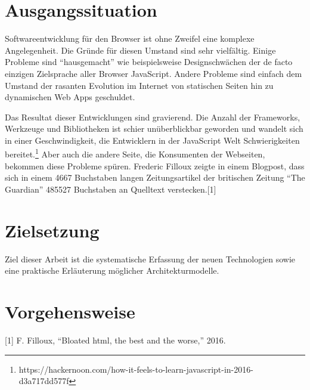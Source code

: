 \section{Ausgangssituation}\label{ausgangssituation}

Softwareentwicklung für den Browser ist ohne Zweifel eine komplexe
Angelegenheit. Die Gründe für diesen Umstand sind sehr vielfältig.
Einige Probleme sind ``hausgemacht'' wie beispielsweise Designschwächen
der de facto einzigen Zielsprache aller Browser JavaScript. Andere
Probleme sind einfach dem Umstand der rasanten Evolution im Internet von
statischen Seiten hin zu dynamischen Web Apps geschuldet.

Das Resultat dieser Entwicklungen sind gravierend. Die Anzahl der
Frameworks, Werkzeuge und Bibliotheken ist schier unüberblickbar
geworden und wandelt sich in einer Geschwindigkeit, die Entwicklern in
der JavaScript Welt Schwierigkeiten bereitet.\footnote{https://hackernoon.com/how-it-feels-to-learn-javascript-in-2016-d3a717dd577f}
Aber auch die andere Seite, die Konsumenten der Webseiten, bekommen
diese Probleme spüren. Frederic Filloux zeigte in einem Blogpost, dass
sich in einem 4667 Buchstaben langen Zeitungsartikel der britischen
Zeitung ``The Guardian'' 485527 Buchstaben an Quelltext
verstecken.{[}1{]}

\section{Zielsetzung}\label{zielsetzung}

Ziel dieser Arbeit ist die systematische Erfassung der neuen
Technologien sowie eine praktische Erläuterung möglicher
Architekturmodelle.

\section*{Vorgehensweise}\label{vorgehensweise}

\hypertarget{refs}{}
\hypertarget{ref-Filloux2016}{}
{[}1{]} F. Filloux, ``Bloated html, the best and the worse,'' 2016.
